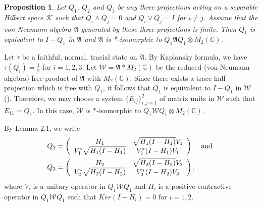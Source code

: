 \documentclass[12pt]{article}
\newtheorem{prop}{Proposition}[section]
\newcommand{\AAA}{\mathfrak A} \newcommand{\TTT}{\mathfrak T}
\newcommand{\WWW}{\mathcal W}
\newcommand{\C}{\mathbb C} %
\begin{document}
{\begin{prop}
Let $Q_1$, $Q_2$ and $Q_3$ be any three projections acting on a
separable Hilbert space $\mathcal{K}$ such that $Q_i \wedge Q_j = 0$
and $Q_i \vee Q_j = I$ for $i \neq j$. Assume that the von Neumann
algebra $\AAA$ generated by these three projections is finite. Then
$Q_1$ is equivalent to $I-Q_1$ in $\AAA$ and $\AAA$ is
*-isomorphic to $Q_1 \AAA Q_1 \otimes M_2(\C)$.
\end{prop}

\quad Let $\tau$ be a faithful, normal, tracial
state  on $\AAA$. By Kaplansky formula,  we have $\tau(Q_i) =
\frac{1}{2}$ for $i=1,2,3$. Let $\WWW =\AAA
* M_{2}(\C)$ be the reduced (von Neumann algebra) free product of
$\AAA$ with $M_2(\C)$. Since there exists a trace half projection
which is free with $Q_1$, it follows that $Q_1$ is equivalent to
$I-Q_1$ in $\WWW$ (\cite{VDN,GY2}). Therefore, we may choose a
system $\{ E_{ij} \}_{i,j = 1}^{2}$ of matrix units  in $\WWW$ such
that $E_{11} = Q_1$. In this case, $\WWW$ is $\ast$-isomorphic to
$Q_1\WWW Q_1 \otimes M_2(\C)$.


By Lemma 2.1, we write
\begin{align*}
&Q_2 = \left(\begin{array}{cc}H_1 & \sqrt{H_1 (I-H_1)}V_1 \\V_1^*
\sqrt{H_1 (I-H_1)} & V_1^{*}(I - H_1)V_1\end{array}\right)\,\,\,\,\,\hbox{ and }\\
&Q_3 = \left(\begin{array}{cc}H_2 & \sqrt{H_2(I-H_2)}V_2 \\V_2^*
\sqrt{H_2(I-H_2)} & V_2^{*}(I - H_2)V_2\end{array}\right),
\end{align*}
where $V_i$ is a unitary operator in $Q_1\WWW Q_1$ and  $H_i$ is a
positive contractive operator in $Q_1\WWW Q_1$ such that $Ker(I-H_i)
=0$ for $i = 1,2$.

}
\end{document}
